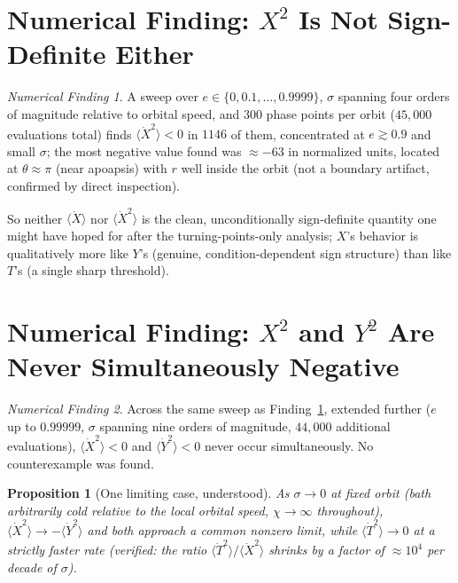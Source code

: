 \documentclass[12pt]{amsart}
\theoremstyle{plain}
\newtheorem{proposition}[theorem]{Proposition}
\theoremstyle{remark}
\newtheorem*{finding}{Numerical Finding}
\begin{document}
\section{Numerical Finding: $X^2$ Is Not Sign-Definite Either}

\begin{finding}\label{find:X2fails}
A sweep over $e\in\{0,0.1,\dots,0.9999\}$, $\sigma$ spanning four orders of magnitude relative to orbital speed, and $300$ phase points per orbit ($45{,}000$ evaluations total) finds $\langle\dot X^2\rangle<0$ in $1146$ of them, concentrated at $e\gtrsim0.9$ and small $\sigma$; the most negative value found was $\approx-63$ in normalized units, located at $\theta\approx\pi$ (near apoapsis) with $r$ well inside the orbit (not a boundary artifact, confirmed by direct inspection).
\end{finding}

So neither $\langle\dot X\rangle$ nor $\langle\dot X^2\rangle$ is the clean, unconditionally sign-definite quantity one might have hoped for after the turning-points-only analysis; $X$'s behavior is qualitatively more like $Y$'s (genuine, condition-dependent sign structure) than like $T$'s (a single sharp threshold).

\section{Numerical Finding: $X^2$ and $Y^2$ Are Never Simultaneously Negative}

\begin{finding}\label{find:neveroverlap}
Across the same sweep as Finding~\ref{find:X2fails}, extended further ($e$ up to $0.99999$, $\sigma$ spanning nine orders of magnitude, $44{,}000$ additional evaluations), $\langle\dot X^2\rangle<0$ and $\langle\dot Y^2\rangle<0$ never occur simultaneously. No counterexample was found.
\end{finding}

\begin{proposition}[One limiting case, understood]\label{prop:limit}
As $\sigma\to0$ at fixed orbit (bath arbitrarily cold relative to the local orbital speed, $\chi\to\infty$ throughout), $\langle\dot X^2\rangle\to-\langle\dot Y^2\rangle$ and both approach a common nonzero limit, while $\langle\dot T^2\rangle\to0$ at a strictly faster rate (verified: the ratio $\langle\dot T^2\rangle/\langle\dot X^2\rangle$ shrinks by a factor of $\approx10^4$ per decade of $\sigma$).
\end{proposition}
\end{document}
